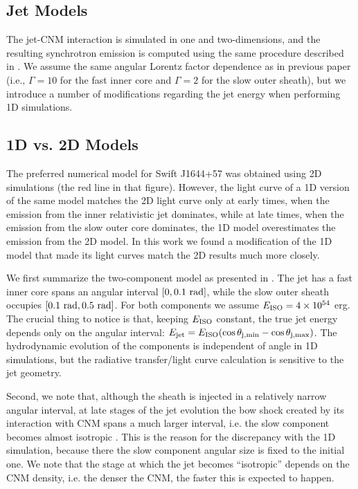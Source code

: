 \documentclass[usenatbib,fleqn]{mnras}
\begin{document}
\subsection{Jet Models}
\label{sec:numerical}

The jet-CNM interaction is simulated in one and two-dimensions, and
the resulting synchrotron emission is computed using the same
procedure described in \citet{Mimica+2015}. We assume the same angular
Lorentz factor dependence as in previous paper (i.e., $\Gamma = 10$
for the fast inner core and $\Gamma = 2$ for the slow outer sheath),
but we introduce a number of modifications regarding the jet energy
when performing 1D simulations.

\subsection{1D vs. 2D Models}
\label{sec:2D}

The preferred numerical model for Swift J1644+57 \citep[Fig.10
in][]{Mimica+2015} was obtained using 2D simulations (the red line in
that figure). However, the light curve of a 1D version of the same
model \citep[black line in Fig. 10 in][see also section 4.2 of that
paper]{Mimica+2015} matches the 2D light curve only at early times,
when the emission from the inner relativistic jet dominates, while at
late times, when the emission from the slow outer core dominates, the
1D model overestimates the emission from the 2D model. In this work we
found a modification of the 1D model that made its light curves
match the 2D results much more closely.

We first summarize the two-component model as presented in
\citet{Mimica+2015}. The jet has a fast inner core spans an angular
interval $[0, 0.1\ {\rm rad}]$, while the slow outer sheath occupies
$[0.1\ {\rm rad}, 0.5\ {\rm rad}]$. For both components we assume
$E_{\rm ISO} = 4\times 10^{54}$ erg. The crucial thing to notice is
that, keeping $E_{\rm ISO}$ constant, the true jet energy depends only
on the angular interval: $E_{\rm jet} = E_{\rm ISO} (\cos\theta_{\rm
  j,min} - \cos\theta_{\rm j,max})$. The hydrodynamic evolution of the
components is independent of angle in 1D simulations, but the
radiative transfer/light curve calculation is sensitive to the jet
geometry.

Second, we note that, although the sheath is injected in a relatively
narrow angular interval, at late stages of the jet evolution the bow
shock created by its interaction with CNM spans a much larger interval,
i.e. the slow component becomes almost isotropic \citep[bottom two
panels in Fig. 8 in][]{Mimica+2015}. This is the reason for the
discrepancy with the 1D simulation, because there the slow component
angular size is fixed to the initial one. We note that the stage at
which the jet becomes ``isotropic'' depends on the CNM density,
i.e. the denser the CNM, the faster this is expected to happen.
\end{document}
